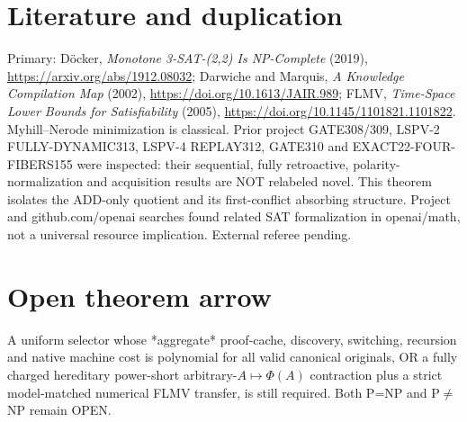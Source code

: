 \documentclass[11pt]{article}
\begin{document}
\section{Literature and duplication}
Primary: D\"ocker, \emph{Monotone 3-SAT-(2,2) Is NP-Complete} (2019), \url{https://arxiv.org/abs/1912.08032}; Darwiche and Marquis, \emph{A Knowledge Compilation Map} (2002), \url{https://doi.org/10.1613/JAIR.989}; FLMV, \emph{Time-Space Lower Bounds for Satisfiability} (2005), \url{https://doi.org/10.1145/1101821.1101822}. Myhill--Nerode minimization is classical. Prior project GATE308/309, LSPV-2 FULLY-DYNAMIC313, LSPV-4 REPLAY312, GATE310 and EXACT22-FOUR-FIBERS155 were inspected: their sequential, fully retroactive, polarity-normalization and acquisition results are NOT relabeled novel. This theorem isolates the ADD-only quotient and its first-conflict absorbing structure. Project and github.com/openai searches found related SAT formalization in openai/math, not a universal resource implication. External referee pending.
\section{Open theorem arrow}
A uniform selector whose *aggregate* proof-cache, discovery, switching, recursion and native machine cost is polynomial for all valid canonical originals, OR a fully charged hereditary power-short arbitrary-$A\mapsto\Phi(A)$ contraction plus a strict model-matched numerical FLMV transfer, is still required. Both P=NP and P$\ne$NP remain OPEN.
\end{document}
